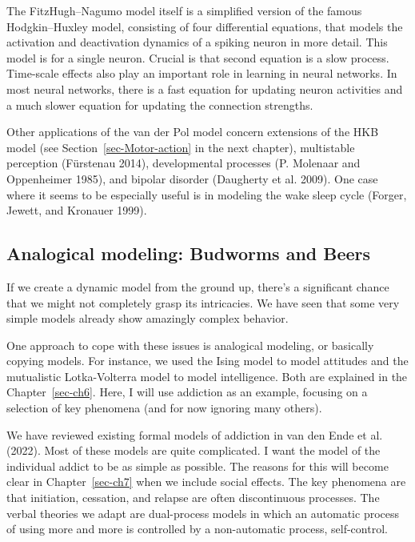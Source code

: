 \documentclass[
  a4paper,
  DIV=11,
  numbers=noendperiod,
  oneside]{scrreprt}
\begin{document}
The FitzHugh--Nagumo model itself is a simplified version of the famous
Hodgkin--Huxley model, consisting of four differential equations, that
models the activation and deactivation dynamics of a spiking neuron in
more detail. This model is for a single neuron. Crucial is that second
equation is a slow process. Time-scale effects also play an important
role in learning in neural networks. In most neural networks, there is a
fast equation for updating neuron activities and a much slower equation
for updating the connection strengths.

Other applications of the van der Pol model concern extensions of the
HKB model (see Section~\ref{sec-Motor-action} in the next chapter),
multistable perception (Fürstenau 2014), developmental processes (P.
Molenaar and Oppenheimer 1985), and bipolar disorder (Daugherty et al.
2009). One case where it seems to be especially useful is in modeling
the wake sleep cycle (Forger, Jewett, and Kronauer 1999).

\hypertarget{sec-Analogical-modeling-Budworms-and-Beers}{%
\subsection{Analogical modeling: Budworms and
Beers}\label{sec-Analogical-modeling-Budworms-and-Beers}}

If we create a dynamic model from the ground up, there's a significant
chance that we might not completely grasp its intricacies. We have seen
that some very simple models already show amazingly complex behavior.

One approach to cope with these issues is analogical modeling, or
basically copying models. For instance, we used the Ising model to model
attitudes and the mutualistic Lotka-Volterra model to model
intelligence. Both are explained in the Chapter~\ref{sec-ch6}. Here, I
will use addiction as an example, focusing on a selection of key
phenomena (and for now ignoring many others).

We have reviewed existing formal models of addiction in van den Ende et
al. (2022). Most of these models are quite complicated. I want the model
of the individual addict to be as simple as possible. The reasons for
this will become clear in Chapter~\ref{sec-ch7} when we include social
effects. The key phenomena are that initiation, cessation, and relapse
are often discontinuous processes. The verbal theories we adapt are
dual-process models in which an automatic process of using more and more
is controlled by a non-automatic process, self-control.
\end{document}
